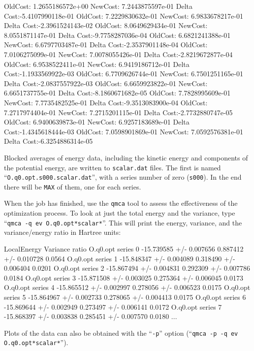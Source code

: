 \begin{shade}
 OldCost: 1.2655186572e+00 NewCost: 7.2443875597e-01 Delta Cost:-5.4107990118e-01
 OldCost: 7.2229830632e-01 NewCost: 6.9833678217e-01 Delta Cost:-2.3961524143e-02
 OldCost: 8.0649629434e-01 NewCost: 8.0551871147e-01 Delta Cost:-9.7758287036e-04
 OldCost: 6.6821241388e-01 NewCost: 6.6797703487e-01 Delta Cost:-2.3537901148e-04
 OldCost: 7.0106275099e-01 NewCost: 7.0078055426e-01 Delta Cost:-2.8219672877e-04
 OldCost: 6.9538522411e-01 NewCost: 6.9419186712e-01 Delta Cost:-1.1933569922e-03
 OldCost: 6.7709626744e-01 NewCost: 6.7501251165e-01 Delta Cost:-2.0837557922e-03
 OldCost: 6.6659923822e-01 NewCost: 6.6651737755e-01 Delta Cost:-8.1860671682e-05
 OldCost: 7.7828995609e-01 NewCost: 7.7735482525e-01 Delta Cost:-9.3513083900e-04
 OldCost: 7.2717974404e-01 NewCost: 7.2715201115e-01 Delta Cost:-2.7732880747e-05
 OldCost: 6.9400639873e-01 NewCost: 6.9257183689e-01 Delta Cost:-1.4345618444e-03
 OldCost: 7.0598901869e-01 NewCost: 7.0592576381e-01 Delta Cost:-6.3254886314e-05
\end{shade}

Blocked averages of energy data, including the kinetic energy and components of the potential energy, are written to \texttt{scalar.dat} files.  The first is named ``\texttt{O.q0.opt.s000.scalar.dat}'', with a series number of zero (\texttt{s000}).  In the end there will be \texttt{MAX} of them, one for each series. 

When the job has finished, use the \texttt{qmca} tool to assess the effectiveness of the optimization process.  To look at just the total energy and the variance, type ``\verb|qmca -q ev O.q0.opt*scalar*|''.  This will print the energy, variance, and the variance/energy ratio in Hartree units:
\begin{shade}
                            LocalEnergy               Variance           ratio
O.q0.opt  series 0  -15.739585 +/- 0.007656   0.887412 +/- 0.010728   0.0564
O.q0.opt  series 1  -15.848347 +/- 0.004089   0.318490 +/- 0.006404   0.0201
O.q0.opt  series 2  -15.867494 +/- 0.004831   0.292309 +/- 0.007786   0.0184
O.q0.opt  series 3  -15.871508 +/- 0.003025   0.275364 +/- 0.006045   0.0173
O.q0.opt  series 4  -15.865512 +/- 0.002997   0.278056 +/- 0.006523   0.0175
O.q0.opt  series 5  -15.864967 +/- 0.002733   0.278065 +/- 0.004413   0.0175
O.q0.opt  series 6  -15.869644 +/- 0.002949   0.273497 +/- 0.006141   0.0172
O.q0.opt  series 7  -15.868397 +/- 0.003838   0.285451 +/- 0.007570   0.0180
...
\end{shade}
\noindent
Plots of the data can also be obtained with the ``\texttt{-p}'' option (``\verb|qmca -p -q ev O.q0.opt*scalar*|'').

